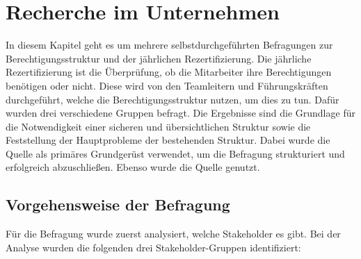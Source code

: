 \chapter{Recherche im Unternehmen}
\label{ch:Recherche}
In diesem Kapitel geht es um mehrere selbstdurchgeführten Befragungen zur Berechtigungsstruktur und der jährlichen Rezertifizierung.
Die jährliche Rezertifizierung ist die Überprüfung, ob die Mitarbeiter ihre Berechtigungen benötigen oder nicht.
Diese wird von den Teamleitern und Führungskräften durchgeführt, welche die Berechtigungsstruktur nutzen, um dies zu tun.
Dafür wurden drei verschiedene Gruppen befragt.
Die Ergebnisse sind die Grundlage für die Notwendigkeit einer sicheren und übersichtlichen Struktur sowie die Feststellung der Hauptprobleme der bestehenden Struktur.
Dabei wurde die Quelle \cite{HowSurvey} als primäres Grundgerüst verwendet, um die Befragung strukturiert und erfolgreich abzuschließen. Ebenso wurde die Quelle \cite{Survey} genutzt.

\section{Vorgehensweise der Befragung}
\label{sec:Vorgehensweise}
Für die Befragung wurde zuerst analysiert, welche Stakeholder es gibt.
Bei der Analyse wurden die folgenden drei Stakeholder-Gruppen identifiziert:

